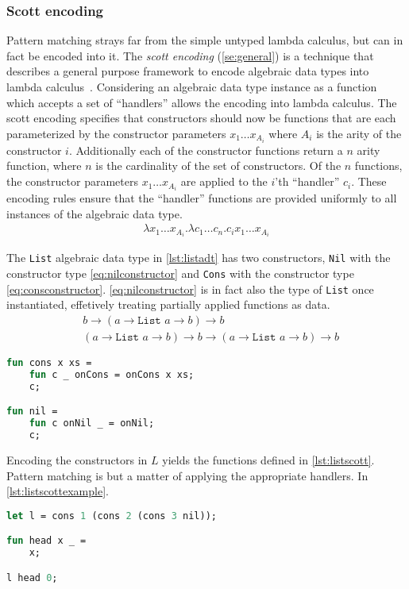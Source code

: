 \documentclass[11pt,oneside,a4paper]{report}
\begin{document}
\subsubsection{Scott encoding}
Pattern matching strays far from the simple untyped lambda calculus, but can in fact be encoded into it.
The \textit{scott encoding} (\autoref{se:general}) is a technique that describes a general purpose framework to encode algebraic data types into lambda calculus~\cite{scott1962system}.
Considering an algebraic data type instance as a function which accepts a set of ``handlers'' allows the encoding into lambda calculus.
The scott encoding specifies that constructors should now be functions that are each parameterized by the constructor parameters $x_1 \dots x_{A_i}$ where $A_i$ is the arity of the constructor $i$.
Additionally each of the constructor functions return a $n$ arity function, where $n$ is the cardinality of the set of constructors.
Of the $n$ functions, the constructor parameters $x_1 \dots x_{A_i}$ are applied to the $i$'th ``handler'' $c_i$.
These encoding rules ensure that the ``handler'' functions are provided uniformly to all instances of the algebraic data type.
\begin{align}
    \lambda x_1 \dots x_{A_i}. \lambda c_1 \dots c_n. c_i x_1 \dots x_{A_i}
\label{se:general}
\end{align}
\begin{exmp}
    The \texttt{List} algebraic data type in \autoref{lst:listadt} has two constructors, \texttt{Nil} with the constructor type \autoref{eq:nilconstructor} and \texttt{Cons} with the constructor type \autoref{eq:consconstructor}.
    \autoref{eq:nilconstructor} is in fact also the type of \texttt{List} once instantiated, effetively treating partially applied functions as data.
\begin{align}
   &b \rightarrow (a \rightarrow \texttt{List } a \rightarrow b) \rightarrow b
   \label{eq:nilconstructor}\\
   &(a \rightarrow \texttt{List } a \rightarrow b) \rightarrow b \rightarrow (a \rightarrow \texttt{List } a \rightarrow b) \rightarrow b
   \label{eq:consconstructor}
\end{align}
\begin{lstlisting}[language=ML,caption={List algebraic data type implementation},label={lst:listscott}]
fun cons x xs = 
    fun c _ onCons = onCons x xs;
    c;

fun nil = 
    fun c onNil _ = onNil;
    c;
\end{lstlisting}
Encoding the constructors in $L$ yields the functions defined in \autoref{lst:listscott}.
Pattern matching is but a matter of applying the appropriate handlers.
In \autoref{lst:listscottexample}.
\begin{lstlisting}[language=ML,caption={Example of scott encoded list algebraic data type},label={lst:listscottexample}]
let l = cons 1 (cons 2 (cons 3 nil));

fun head x _ = 
    x;

l head 0;
\end{lstlisting}
\end{exmp}
\end{document}
